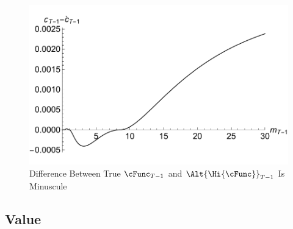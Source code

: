 \documentclass[titlepage]{\econtex}
\begin{document}
\hypertarget{IntExpFOCInvPesReaOptGapPlot}{}
\begin{figure}
  \includegraphics{./Figures/IntExpFOCInvPesReaOptGapPlot}
  \caption{Difference Between True $\cFunc_{T-1}$ and $\Alt{\Hi{\cFunc}}_{T-1}$ Is Minuscule}
  \label{fig:IntExpFOCInvPesReaOptGapPlot}
\end{figure}




\hypertarget{Value}{}
\subsection{Value}
\end{document}
